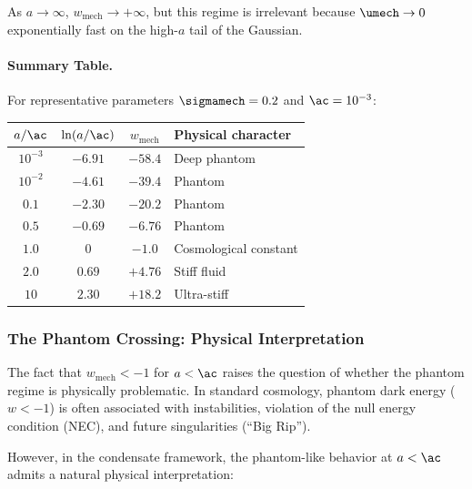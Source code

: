 As $a \to \infty$, $w_{\mathrm{mech}} \to +\infty$, but this regime is irrelevant because $\umech \to 0$ exponentially fast on the high-$a$ tail of the Gaussian.

\paragraph{Summary Table.}
For representative parameters $\sigmamech = 0.2$ and $\ac = 10^{-3}$:

\begin{center}
\begin{tabular}{c|c|c|l}
\toprule
$a/\ac$ & $\ln(a/\ac)$ & $w_{\mathrm{mech}}$ & Physical character \\
\midrule
$10^{-3}$ & $-6.91$ & $-58.4$ & Deep phantom \\
$10^{-2}$ & $-4.61$ & $-39.4$ & Phantom \\
$0.1$ & $-2.30$ & $-20.2$ & Phantom \\
$0.5$ & $-0.69$ & $-6.76$ & Phantom \\
$1.0$ & $0$ & $-1.0$ & Cosmological constant \\
$2.0$ & $0.69$ & $+4.76$ & Stiff fluid \\
$10$ & $2.30$ & $+18.2$ & Ultra-stiff \\
\bottomrule
\end{tabular}
\end{center}

\subsubsection{The Phantom Crossing: Physical Interpretation}

The fact that $w_{\mathrm{mech}} < -1$ for $a < \ac$ raises the question of whether the phantom regime is physically problematic. In standard cosmology, phantom dark energy ($w < -1$) is often associated with instabilities, violation of the null energy condition (NEC), and future singularities (``Big Rip'').

However, in the condensate framework, the phantom-like behavior at $a < \ac$ admits a natural physical interpretation:

